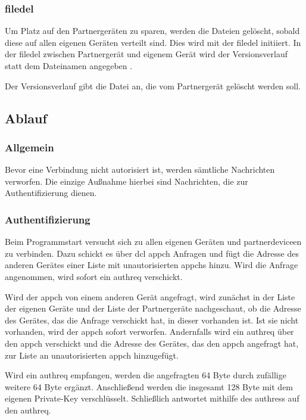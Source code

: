 \subsubsection{\gls{filedel}}
\sblitfiledelpartbytefield
Um Platz auf den Partnergeräten zu sparen, werden die Dateien gelöscht, sobald diese auf allen eigenen Geräten verteilt sind. Dies wird mit der \gls{filedel} initiiert. In der \gls{filedel} zwischen Partnergerät und eigenem Gerät wird der Versionsverlauf statt dem Dateinamen angegeben .
\begin{description}
	Der Versionsverlauf gibt die Datei an, die vom Partnergerät gelöscht werden soll. 
\end{description}

\subsection{Ablauf}
\subsubsection{Allgemein}
Bevor eine Verbindung nicht autorisiert ist, werden sämtliche Nachrichten verworfen. Die einzige Außnahme hierbei sind Nachrichten, die zur Authentifizierung dienen. 

\subsubsection{Authentifizierung}
Beim Programmstart versucht sich \sblit zu allen eigenen Geräten und \gls{partnerdevice}en zu verbinden. Dazu schickt es über \gls{dcl} \gls{appch} Anfragen und fügt die Adresse des anderen Gerätes einer Liste mit unautorisierten \gls{appch}s hinzu. Wird die Anfrage angenommen, wird sofort ein \gls{authreq} verschickt. 

Wird der \gls{appch} von einem anderen Gerät angefragt, wird zunächst in der Liste der eigenen Geräte  und der Liste der Partnergeräte  nachgeschaut, ob die Adresse des Gerätes, das die Anfrage verschickt hat, in dieser vorhanden ist. Ist sie nicht vorhanden, wird der \gls{appch} sofort verworfen. Andernfalls wird ein \gls{authreq} über den \gls{appch} verschickt und die Adresse des Gerätes, das den \gls{appch} angefragt hat, zur Liste an unautorisierten \gls{appch} hinzugefügt.

Wird ein \gls{authreq} empfangen, werden die angefragten 64 Byte durch zufällige weitere 64 Byte ergänzt. Anschließend werden die insgesamt 128 Byte mit dem eigenen Private-Key verschlüsselt. Schließlich antwortet \sblit mithilfe des \gls{authres}s auf den \gls{authreq}.

